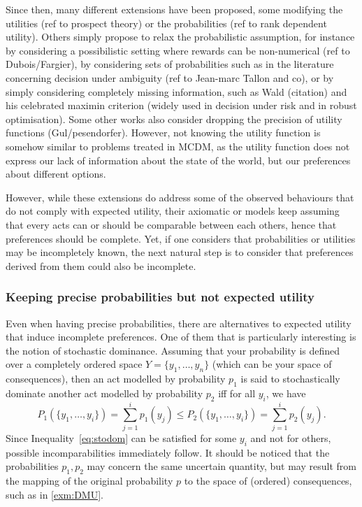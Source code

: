 \documentclass[french, english]{llncs}
\begin{document}
	Since then, many different extensions have been proposed, some modifying the utilities (ref to prospect theory) or the probabilities (ref to rank dependent utility). Others simply propose to relax the probabilistic assumption, for instance by considering a possibilistic setting where rewards can be non-numerical (ref to Dubois/Fargier), by considering sets of probabilities such as in the literature concerning decision under ambiguity (ref to Jean-marc Tallon and co), or by simply considering completely missing information, such as Wald (citation)  and his celebrated maximin criterion (widely used in decision under risk and in robust optimisation). Some other works also consider dropping the precision of utility functions (Gul/pesendorfer). However, not knowing the utility function is somehow similar to problems treated in MCDM, as the utility function does not express our lack of information about the state of the world, but our preferences about different options. 
	
	However, while these extensions do address some of the observed behaviours that do not comply with expected utility, their axiomatic or models keep assuming that every acts can or should be comparable between each others, hence that preferences should be complete. Yet, if one considers that probabilities or utilities may be incompletely known, the next natural step is to consider that preferences derived from them could also be incomplete. 
	
	\subsubsection{Keeping precise probabilities but not expected utility}
	
	Even when having precise probabilities, there are alternatives to expected utility that induce incomplete preferences. One of them that is particularly interesting is the notion of stochastic dominance. Assuming that your probability is defined over a completely ordered space $Y=\{y_1,\ldots,y_n\}$ (which can be your space of consequences), then an act modelled by probability $p_1$ is said to stochastically dominate another act modelled by probability $p_2$ iff for all $y_i$, we have
	\begin{equation}\label{eq:stodom}P_1(\{y_1,\ldots,y_i\})=\sum_{j=1}^i p_1(y_j) \leq P_2(\{y_1,\ldots,y_i\})=\sum_{j=1}^i p_2(y_j).\end{equation}
	Since Inequality~\eqref{eq:stodom} can be satisfied for some $y_i$ and not for others, possible incomparabilities immediately follow. It should be noticed that the probabilities $p_1,p_2$ may concern the same uncertain quantity, but may result from the mapping of the original probability $p$ to the space of (ordered) consequences, such as in \cref{exm:DMU}.
	
\end{document}
